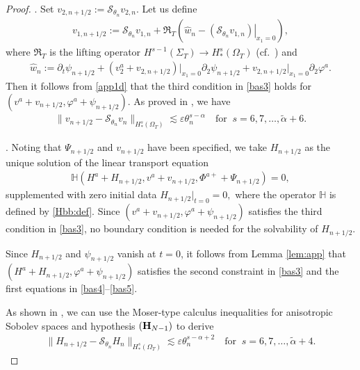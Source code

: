 \documentclass[twoside,11pt]{article}
\numberwithin{equation}{section}
\def\p{\partial}
\begin{document}
\begin{proof}
	\vspace*{2mm}
	.\quad	
	Set  $v_{2,n+1/2}:=\mathcal{S}_{\theta_n} v_{2, n}$.
	Let us define
	\begin{gather*}
		v_{1,n+1/2}:=
		\mathcal{S}_{\theta_{{n}}}v_{1,n}+
		\mathfrak{R}_T\left(\hat{w}_{n}- \left.\left(\mathcal{S}_{\theta_{{n}}}v_{1,n} \right)\right|_{x_1=0} \right),
	\end{gather*}
	where $\mathfrak{R}_T$ is the lifting operator $H^{s-1}(\Sigma_{T})\to H_*^{s}(\Omega_{T})$ (cf.~\cite[Theorem 1]{OSY94MR1289186}) and
	\begin{gather*}
		\hat{w}_{n}:=\p_t \psi_{n+1/2} +
		(v_2^{a}+v_{2,n+1/2}) \big|_{x_1=0}\p_2 \psi_{n+1/2} +v_{2,n+1/2}\big|_{x_1=0}
		\p_2\varphi^a  .
	\end{gather*}
	Then it follows from \eqref{app1d} that the third condition  in \eqref{bas3} holds for $(v^a+v_{n+1/2},\varphi^a+\psi_{n+1/2})$.
	As proved in \cite[Proposition 4.8]{TW21MR4201624}, we have
	\begin{align}
		\|v_{n+1/2}-\mathcal{S}_{\theta_{{n}}}v_{n}\|_{H_*^{s}(\Omega_{T})}
		\lesssim  \varepsilon \theta_n^{s-{\alpha }}
		\quad \textrm{for }\ s =6,7,\ldots, \widetilde{\alpha}+{6}.
		\label{MS.e2}
	\end{align}
	
	\vspace*{1mm}
	.\quad
	Noting that $\Psi_{n+1/2} $ and ${v}_{n+1/2}$ have been specified,
	we take ${H}_{n+1/2} $ as the unique solution of the linear transport equation
	\begin{align} \label{MS.eq1}
		\mathbb{H}(H^{a}+{H}_{n+1/2},v^{a}+{v}_{n+1/2},\Phi^{a+}+\Psi_{n+1/2})=0,
	\end{align}
	supplemented with zero initial data ${H}_{n+1/2} |_{t=0}=0,$
	where the operator $\mathbb{H}$ is defined by \eqref{Hbb:def}.
	Since $(v^a+v_{n+1/2},\varphi^a+\psi_{n+1/2})$ satisfies the third condition  in \eqref{bas3},
	no boundary condition is needed for the solvability of $H_{n+1/2}$.
	
	Since ${H}_{n+1/2}$ and $\psi_{{n}+1/2}$ vanish at $t=0$,
	it follows from Lemma \ref{lem:app}
	that $(H^a+H_{n+1/2},\varphi^a+\psi_{n+1/2})$ satisfies the second constraint in \eqref{bas3} and the first equations in \eqref{bas4}--\eqref{bas5}.
	
	As shown in \cite[Proposition 4.8]{TW21MR4201624}, we can use the Moser-type calculus inequalities for anisotropic Sobolev spaces  and hypothesis $({\bf H}_{N-1})$ to derive
	\begin{align}
		\big\| {H}_{n+1/2} -\mathcal{S}_{\theta_n}H_{n} \big\|_{H_*^{s}(\Omega_{T})}
		\lesssim \varepsilon \theta_n^{s-{\alpha }+2}
		\quad \textrm{for }\ s =6,7,\ldots, \widetilde{\alpha}+{4}.	
		\nonumber
	\end{align}
	

\end{proof}
\end{document}
